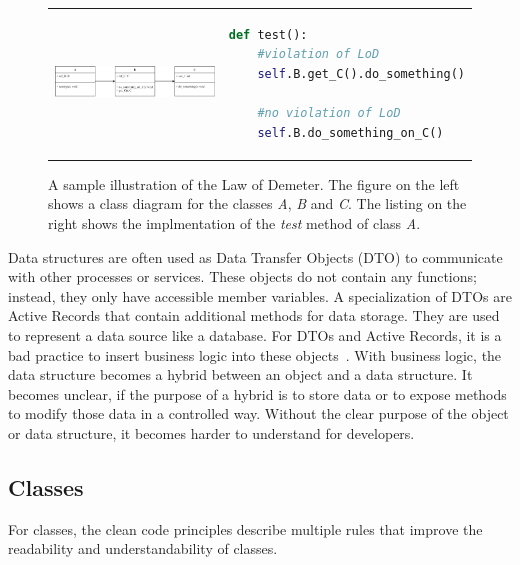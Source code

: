 \begin{figure}
\begin{tabular}{p{}p{}}
    \begin{minipage}{0.45\textwidth}
        \centering
    \includegraphics[width=\linewidth]{img/Background/LawOfDemeterUML.pdf}
    \label{fig:background_control_flow_graph_image}
    \end{minipage}
&
\begin{minipage}[c]{0.45\textwidth}
\centering
\begin{lstlisting}[language=Python, label=lst:background_control_flow_graph_listing]
def test():
    #violation of LoD
    self.B.get_C().do_something()

    #no violation of LoD
    self.B.do_something_on_C()
\end{lstlisting}
\end{minipage}
\end{tabular}
\caption[Illustration Law of Demeter]{A sample illustration of the Law of Demeter. The figure on the left shows a class diagram for the classes \textit{A}, \textit{B} and \textit{C}. The listing on the right shows the implmentation of the \textit{test} method of class \textit{A}.  }
\label{fig:LoD}
\end{figure}



Data structures are often used as Data Transfer Objects (DTO) to communicate with other processes or services. These objects do not contain any functions; instead, they only have accessible member variables. A specialization of DTOs are Active Records that contain additional methods for data storage. They are used to represent a data source like a database. For DTOs and Active Records, it is a bad practice to insert business logic into these objects~\cite{martin_clean_2009}. With business logic, the data structure becomes a hybrid between an object and a data structure. It becomes unclear, if the purpose of a hybrid is to store data or to expose methods to modify those data in a controlled way. Without the clear purpose of the object or data structure, it becomes harder to understand for developers.


\subsection{Classes}\label{sec:classes}
For classes, the clean code principles describe multiple rules that improve the readability and understandability of classes.

